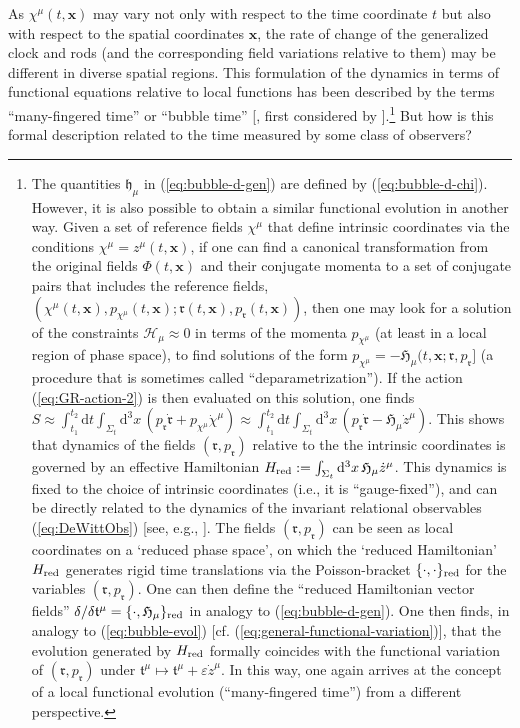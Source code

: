 \documentclass[12pt]{iopart}
\def\eref#1{(\ref{eq:#1})}
\def\D{\mathrm{d}}
\def\x{\mathbf{x}}
\begin{document}
As $\chi^{\mu}(t,\x)$ may vary not only with respect to the time coordinate $t$ but also with respect to the spatial coordinates $\x$, the rate of change of the generalized clock and rods (and the corresponding field variations relative to them) may be different in diverse spatial regions. This formulation of the dynamics in terms of functional equations relative to local functions has been described by the terms ``many-fingered time'' \citep[Chap. 21, Box 21.1]{Misner:1973prb} or ``bubble time'' [\citet{KucharBubble}, first considered by \citet{Tomonaga:1946zz}].\footnote{\label{foot:reduced}The quantities $\mathfrak{h}_{\mu}$ in \eref{bubble-d-gen} are defined by \eref{bubble-d-chi}. However, it is also possible to obtain a similar functional evolution in another way. Given a set of reference fields $\chi^{\mu}$ that define intrinsic coordinates via the conditions $\chi^{\mu}=z^{\mu}(t,\x)$, if one can find a canonical transformation from the original fields $\Phi(t,\x)$ and their conjugate momenta to a set of conjugate pairs that includes the reference fields, $(\chi^{\mu}(t,\x),p_{\chi^{\mu}}(t,\x); \mathfrak{r}(t,\x),p_{\mathfrak{r}}(t,\x))$, then one may look for a solution of the constraints $\mathcal{H}_{\mu}\approx0$ in terms of the momenta $p_{\chi^{\mu}}$ (at least in a local region of phase space), to find solutions of the form $p_{\chi^{\mu}} = -\mathfrak{H}_{\mu}(t,\x;\mathfrak{r},p_{\mathfrak{r}}]$ (a procedure that is sometimes called ``deparametrization''). If the action \eref{GR-action-2} is then evaluated on this solution, one finds $S \approx \int_{t_1}^{t_2}\D t\int_{\Sigma_t}\D^3x\,\left(p_{\mathfrak{r}}\dot{\mathfrak{r}}+p_{\chi^{\mu}}\dot{\chi}^{\mu}\right) \approx \int_{t_1}^{t_2}\D t\int_{\Sigma_t}\D^3x\,\left(p_{\mathfrak{r}}\dot{\mathfrak{r}}-\mathfrak{H}_{\mu}\dot{z}^{\mu}\right)$. This shows that dynamics of the fields $(\mathfrak{r}, p_{\mathfrak{r}})$ relative to the the intrinsic coordinates is governed by an effective Hamiltonian $H_{\rm red} := \int_{\Sigma_t}\D^3x\,\mathfrak{H}_{\mu}\dot{z}^{\mu}$. This dynamics is fixed to the choice of intrinsic coordinates (i.e., it is ``gauge-fixed''), and can be directly related to the dynamics of the invariant relational observables \eref{DeWittObs} [see, e.g., \cite{Barvinsky:1993jf,Chataig:Thesis}]. The fields $(\mathfrak{r}, p_{\mathfrak{r}})$ can be seen as local coordinates on a `reduced phase space', on which the `reduced Hamiltonian' $H_{\rm red}$ generates rigid time translations via the  Poisson-bracket $\{\cdot,\cdot\}_{\rm red}$ for the variables $(\mathfrak{r}, p_{\mathfrak{r}})$. One can then define the ``reduced Hamiltonian vector fields'' $\delta/\delta\mathfrak{t}^{\mu} = \{\cdot,\mathfrak{H}_{\mu}\}_{\rm red}$ in analogy to \eref{bubble-d-gen}. One then finds, in analogy to \eref{bubble-evol} [cf. \eref{general-functional-variation}], that the evolution generated by $H_{\rm red}$ formally coincides with the functional variation of $(\mathfrak{r}, p_{\mathfrak{r}})$ under $\mathfrak{t}^{\mu}\mapsto \mathfrak{t}^{\mu}+\varepsilon\dot{z}^{\mu}$. In this way, one again arrives at the concept of a local functional evolution (``many-fingered time'') from a different perspective.} But how is this formal description related to the time measured by some class of observers?
\end{document}
